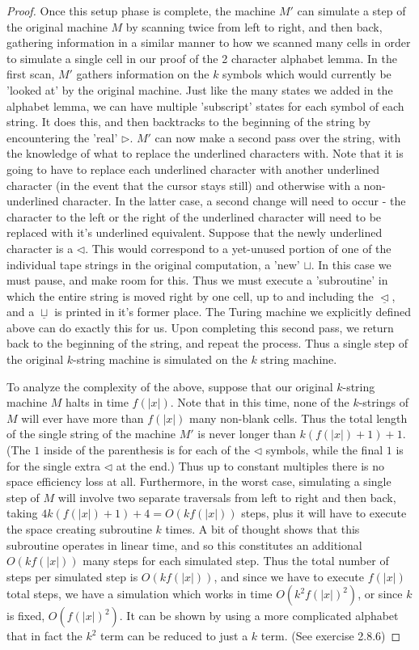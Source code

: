 \begin{proof}
	Once this setup phase is complete, the machine $M'$ can simulate a step of the original machine $M$ by scanning twice from left to right, and then back, gathering information in a similar manner to how we scanned many cells in order to simulate a single cell in our proof of the 2 character alphabet lemma. In the first scan, $M'$ gathers information on the $k$ symbols which would currently be 'looked at' by the original machine. Just like the many states we added in the alphabet lemma, we can have multiple 'subscript' states for each symbol of each string. It does this, and then backtracks to the beginning of the string by encountering the 'real' $\triangleright$. $M'$ can now make a second pass over the string, with the knowledge of what to replace the underlined characters with. Note that it is going to have to replace each underlined character with another underlined character (in the event that the cursor stays still) and otherwise with a non-underlined character. In the latter case, a second change will need to occur - the character to the left or the right of the underlined character will need to be replaced with it's underlined equivalent. Suppose that the newly underlined character is a $\triangleleft$. This would correspond to a yet-unused portion of one of the individual tape strings in the original computation, a 'new' $\sqcup$. In this case we must pause, and make room for this. Thus we must execute a 'subroutine' in which the entire string is moved right by one cell, up to and including the $\underline{\triangleleft}$, and a $\underline{\sqcup}$ is printed in it's former place. The Turing machine we explicitly defined above can do exactly this for us. Upon completing this second pass, we return back to the beginning of the string, and repeat the process. Thus a single step of the original $k$-string machine is simulated on the $k$ string machine.
	
    To analyze the complexity of the above, suppose that our original $k$-string machine $M$ halts in time $f(|x|)$. Note that in this time, none of the $k$-strings of $M$ will ever have more than $f(|x|)$ many non-blank cells. Thus the total length of the single string of the machine $M'$ is never longer than $k(f(|x|)+1)+1$. (The $1$ inside of the parenthesis is for each of the $\triangleleft$ symbols, while the final $1$ is for the single extra $\triangleleft$ at the end.) Thus up to constant multiples there is no space efficiency loss at all. Furthermore, in the worst case, simulating a single step of $M$ will involve two separate traversals from left to right and then back, taking $4k(f(|x|)+1)+4 = O(kf(|x|))$ steps, plus it will have to execute the space creating subroutine $k$ times. A bit of thought shows that this subroutine operates in linear time, and so this constitutes an additional $O(kf(|x|))$ many steps for each simulated step. Thus the total number of steps per simulated step is $O(kf(|x|))$, and since we have to execute $f(|x|)$ total steps, we have a simulation which works in time $O(k^2f(|x|)^2)$, or since $k$ is fixed, $O(f(|x|)^2)$. It can be shown by using a more complicated alphabet that in fact the $k^2$ term can be reduced to just a $k$ term. (See \cite{papadimitriouComputationalComplexity1994} exercise 2.8.6)
\end{proof}
